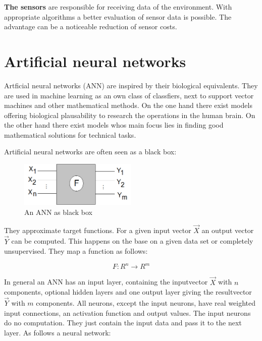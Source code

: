 \documentclass[10pt,a4paper,DIV=11]{scrreprt}
\begin{document}
\textbf{The sensors} are responsible for receiving data of the environment. With appropriate algorithms a better evaluation of sensor data is possible. The advantage can be a noticeable reduction of sensor costs.


\chapter{Artificial neural networks}
Artficial neural networks (ANN) are inspired by their biological equivalents.
They are used in machine learning as an own class of classfiers, next to support vector machines
and other mathematical methods. On the one hand there exist models offering biological plausability to research the
operations in the human brain. On the other hand there exist models whos main focus lies in finding good mathematical solutions for technical tasks.

Artificial neural networks are often seen as a black box: \\

\begin{center}
	\begin{figure}[H]
		\centering
		\includegraphics[width=0.5\textwidth,scale=1.0]{files/nn-bb.png}  
		\caption{An ANN as black box \cite{rojas}}
		\label{fig:neuron}
	\end{figure}
\end{center} 
They approximate target functions. For a given input vector $\vec{X}$ an output vector $\vec{Y}$ can be computed.
This happens on the base on a given data set or completely unsupervised.
They map a function as follows\cite{rojas}:

\begin{equation}
	F: R^n \to R^m 
\end{equation} 


In general an ANN has an input layer, containing the inputvector $\vec{X}$ with $n$ components, optional hidden layers and one output layer giving the resultvector $\vec{Y}$ with $m$ components.
All neurons, except the input neurons, have real weighted input connections, an activation function and output values. The input neurons do no computation. They just contain the input data and pass it to the next layer. As follows a neural network:
\end{document}
